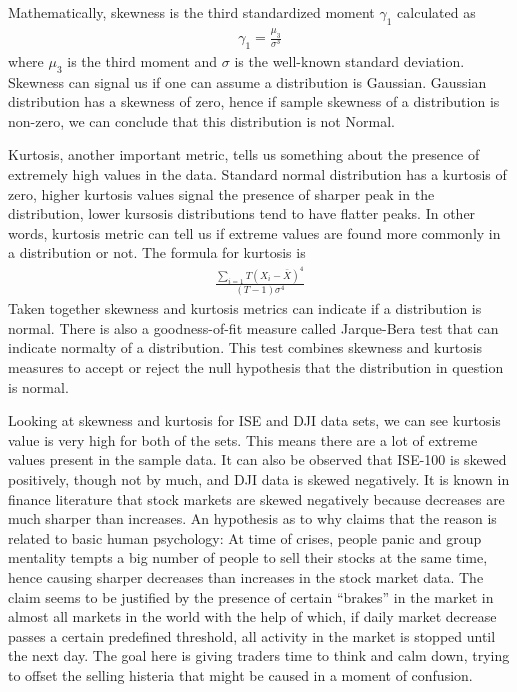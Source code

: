 Mathematically, skewness is the third standardized moment $\gamma_1$ calculated
as 
\begin{eqnarray*}
\gamma_1 = \frac{\mu_3}{\sigma^3}
\end{eqnarray*}
where $\mu_3$ is the third moment and $\sigma$ is the well-known standard
deviation. Skewness can signal us if one can assume a distribution is
Gaussian. Gaussian distribution has a skewness of zero, hence if sample skewness
of a distribution is non-zero, we can conclude that this distribution is not
Normal. 

Kurtosis, another important metric, tells us something about the presence of
extremely high values in the data. Standard normal distribution has a kurtosis
of zero, higher kurtosis values signal the presence of sharper peak in the
distribution, lower kursosis distributions tend to have flatter peaks. In other
words, kurtosis metric can tell us if extreme values are found more commonly in
a distribution or not. The formula for kurtosis is 
\begin{eqnarray*}
\frac{\sum_{i=1}T(X_i - \bar{X})^4}{(T-1)\sigma^4}
\end{eqnarray*}
Taken together skewness and kurtosis metrics can indicate if a distribution is
normal. There is also a goodness-of-fit measure called Jarque-Bera test that can
indicate normalty of a distribution. This test combines skewness and kurtosis
measures to accept or reject the null hypothesis that the distribution in
question is normal.

Looking at skewness and kurtosis for ISE and DJI data sets, we can see kurtosis
value is very high for both of the sets. This means there are a lot of extreme
values present in the sample data. It can also be observed that ISE-100 is
skewed positively, though not by much, and DJI data is skewed negatively. It is
known in finance literature that stock markets are skewed negatively because
decreases are much sharper than increases. An hypothesis as to why claims that
the reason is related to basic human psychology: At time of crises, people panic
and group mentality tempts a big number of people to sell their stocks at the
same time, hence causing sharper decreases than increases in the stock market
data. The claim seems to be justified by the presence of certain ``brakes'' in
the market in almost all markets in the world with the help of which, if daily
market decrease passes a certain predefined threshold, all activity in the
market is stopped until the next day. The goal here is giving traders time to
think and calm down, trying to offset the selling histeria that might be caused
in a moment of confusion. 

